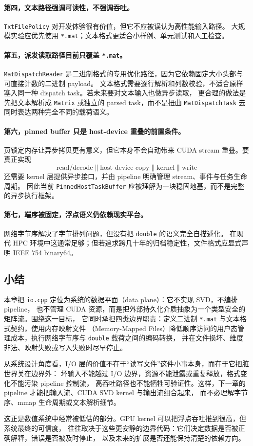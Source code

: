 \paragraph{第四，文本路径强调可读性，不强调吞吐。}
\texttt{TxtFilePolicy} 对开发体验很有价值，但它不应被误认为高性能输入路径。
大规模实验应优先使用 \texttt{*.mat}；文本格式更适合小样例、单元测试和人工检查。

\paragraph{第五，派发读取路径目前只覆盖 \texttt{*.mat}。}
\texttt{MatDispatchReader} 是二进制格式的专用优化路径，因为它依赖固定大小头部与可直接计数的二进制 payload。
文本格式需要逐行解析和列数校验，不适合原样塞入同一种 dispatch task。若未来要对文本输入也做异步读取，
更合理的做法是先把文本解析成 \texttt{Matrix} 或独立的 parsed task，而不是扭曲 \texttt{MatDispatchTask}
去同时表达两种完全不同的载荷语义。

\paragraph{第六，pinned buffer 只是 host-device 重叠的前置条件。}
页锁定内存让异步拷贝更有意义，但它本身不会自动带来 CUDA stream 重叠。要真正实现
\[
    \text{read/decode}
    \parallel
    \text{host-device copy}
    \parallel
    \text{kernel}
    \parallel
    \text{write}
\]
还需要 kernel 层提供异步接口，并由 pipeline 明确管理 stream、事件与任务生命周期。
因此当前 \texttt{PinnedHostTaskBuffer} 应被理解为一块稳固地基，而不是完整的异步执行框架。

\paragraph{第七，端序被固定，浮点语义仍依赖现实平台。}
网络字节序解决了字节排列问题，但没有把 \texttt{double} 的语义完全自描述化。
在现代 HPC 环境中这通常足够；但若追求跨几十年的归档稳定性，文件格式应显式声明 IEEE 754 binary64。

\subsection{小结}

本章把 \texttt{io.cpp} 定位为系统的数据平面（data plane）：它不实现 SVD，不编排 pipeline，
也不管理 CUDA 资源，而是把外部持久化介质抽象为一个类型安全的矩阵流。围绕这一目标，
它同时承担四类边界职责：定义二进制 \texttt{*.mat} 与文本格式契约，使用内存映射文件
（Memory-Mapped Files）降低顺序访问的用户态管理成本，执行网络字节序与 \texttt{double} 载荷之间的编码转换，
并在文件损坏、维度非法、映射失败或写入失败时尽早停止。

从系统设计角度看，I/O 层的价值不在于“读写文件”这件小事本身，而在于它把脏世界关在边界外：
坏输入不能越过 I/O 边界，资源不能泄露或重复释放，格式变化不能污染 pipeline 控制流，
高吞吐路径也不能牺牲可验证性。这样，下一章的 pipeline 才能把输入流、CUDA SVD kernel 与输出流组合起来，
而不必理解字节序、mmap 生命周期或文本解析细节。

这正是数值系统中经常被低估的部分。GPU kernel 可以把浮点吞吐推到很高，但系统最终的可信度，
往往取决于这些更安静的边界代码：它们决定数据是否被正确解释，错误是否被及时停止，
以及未来的扩展是否还能保持清楚的依赖方向。
